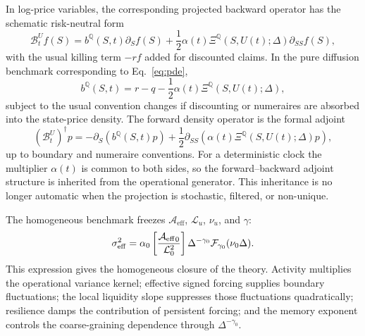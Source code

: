 \documentclass[11pt]{amsart}
\newcommand{\Q}{\mathbb{Q}}
\newcommand{\cL}{\mathcal{L}}
\newcommand{\Aeff}{\mathcal{A}_{\mathrm{eff}}}
\newcommand{\Fcal}{\mathcal{F}}
\newcommand{\Xiop}{\Xi}
\newcommand{\Bop}{\mathcal{B}}
\theoremstyle{definition}
\theoremstyle{plain}
\theoremstyle{remark}
\begin{document}
In log-price variables, the corresponding projected backward operator has the schematic risk-neutral form
\begin{equation}
 \Bop_t^U f(S)=b^\Q(S,t)\partial_S f(S)+\frac12\alpha(t)\Xiop^\Q(S,U(t);\Delta)\partial_{SS}f(S),
 \label{eq:backward-operator}
\end{equation}
with the usual killing term $-r f$ added for discounted claims. In the pure diffusion benchmark corresponding to Eq.~\eqref{eq:pde},
\[
 b^\Q(S,t)=r-q-\frac12\alpha(t)\Xiop^\Q(S,U(t);\Delta),
\]
subject to the usual convention changes if discounting or numeraires are absorbed into the state-price density. The forward density operator is the formal adjoint
\begin{equation}
 (\Bop_t^U)^\dagger p=-\partial_S\left(b^\Q(S,t)p\right)+\frac12\partial_{SS}\left(\alpha(t)\Xiop^\Q(S,U(t);\Delta)p\right),
 \label{eq:forward-adjoint}
\end{equation}
up to boundary and numeraire conventions. For a deterministic clock the multiplier $\alpha(t)$ is common to both sides, so the forward--backward adjoint structure is inherited from the operational generator. This inheritance is no longer automatic when the projection is stochastic, filtered, or non-unique.

The homogeneous benchmark freezes $\Aeff$, $\cL_u$, $\nu_u$, and $\gamma$:
\begin{equation}
 \sigma_{\rm eff}^2=\alpha_0
 \left[\frac{{\Aeff}_0}{\cL_0^2}\right]
 \Delta^{-\gamma_0}
 \Fcal_{\gamma_0}(\nu_0\Delta).
 \label{eq:homogeneous-result}
\end{equation}
This expression gives the homogeneous closure of the theory. Activity multiplies the operational variance kernel; effective signed forcing supplies boundary fluctuations; the local liquidity slope suppresses those fluctuations quadratically; resilience damps the contribution of persistent forcing; and the memory exponent controls the coarse-graining dependence through $\Delta^{-\gamma_0}$.
\end{document}
